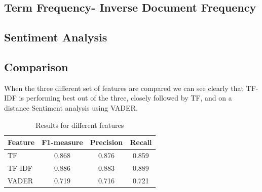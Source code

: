 \subsection{Term Frequency- Inverse Document Frequency}


\subsection{Sentiment Analysis}


\subsection{Comparison}

When the three different set of features are compared we can see clearly that TF-IDF is performing best out of the three, closely followed by TF, and on a distance Sentiment analysis using VADER.

\begin{table}
    \centering
    \caption{Results for different features\label{tab:features-comp}}
    \begin{tabular}{ l| S[table-format=1.3] |S[table-format=1.3] |S[table-format=1.3] }
    \hline
        \bf{Feature} & \bf{F1-measure} & \bf{Precision} & \bf{Recall} \\
    \hline
        TF & 0.868 & 0.876 & 0.859 \\ 
        TF-IDF & 0.886 & 0.883 & 0.889 \\
        VADER & 0.719 & 0.716 & 0.721 \\
        \hline
    \end{tabular}
\end{table}
